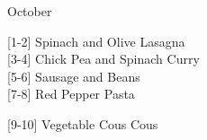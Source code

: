 		\begin{menu}{October}
    
    \begin{recipelist}
    
        {\scriptsize[1-2]} Spinach and Olive Lasagna\\
        {\scriptsize[3-4]} Chick Pea and Spinach Curry\\
        {\scriptsize[5-6]} Sausage and Beans\\
        {\scriptsize[7-8]} Red Pepper Pasta\\%
    \end{recipelist}%
    \begin{recipelist}
    
        {\scriptsize[9-10]} Vegetable Cous Cous\\
    \end{recipelist}\par%
  

\end{menu}
